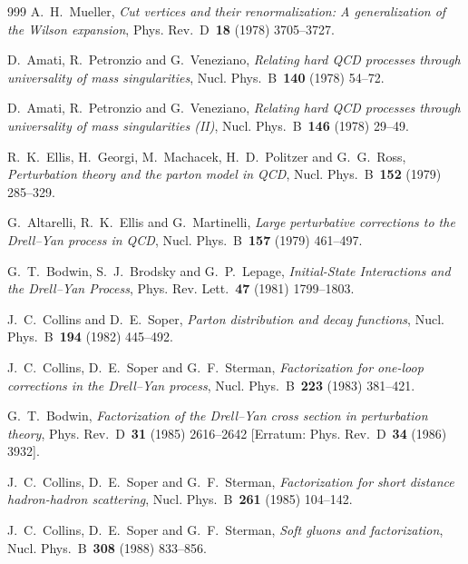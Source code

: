 \begin{thebibliography}{999}
A.~H.~Mueller, \emph{Cut vertices and their renormalization: A generalization of the Wilson expansion}, Phys. Rev.~D~\textbf{18} (1978) \mbox{3705--3727}.

D.~Amati, R.~Petronzio and G.~Veneziano, \emph{Relating hard QCD processes through universality of mass singularities}, Nucl. Phys.~B~\textbf{140} (1978) \mbox{54--72}.

D.~Amati, R.~Petronzio and G.~Veneziano, \emph{Relating hard QCD processes through universality of mass singularities (II)}, Nucl. Phys.~B~\textbf{146} (1978) \mbox{29--49}.

R.~K.~Ellis, H.~Georgi, M.~Machacek, H.~D.~Politzer and G.~G.~Ross, \emph{Perturbation theory and the parton model in QCD}, Nucl. Phys.~B~\textbf{152} (1979) \mbox{285--329}.

G.~Altarelli, R.~K.~Ellis and G.~Martinelli, \emph{Large perturbative corrections to the Drell--Yan process in QCD}, Nucl. Phys.~B~\textbf{157} (1979) \mbox{461--497}.

G.~T.~Bodwin, S.~J.~Brodsky and G.~P.~Lepage, \emph{Initial-State Interactions and the Drell--Yan Process}, Phys. Rev. Lett.~\textbf{47} (1981) \mbox{1799--1803}.

J.~C.~Collins and D.~E.~Soper, \emph{Parton distribution and decay functions}, Nucl. Phys.~B~\textbf{194} (1982) \mbox{445--492}.

J.~C.~Collins, D.~E.~Soper and G.~F.~Sterman, \emph{Factorization for one-loop corrections in the Drell--Yan process}, Nucl. Phys.~B~\textbf{223} (1983) \mbox{381--421}.

G.~T.~Bodwin, \emph{Factorization of the Drell--Yan cross section in perturbation theory}, Phys. Rev.~D~\textbf{31} (1985) \mbox{2616--2642} [Erratum: Phys. Rev.~D~\textbf{34} (1986) \mbox{3932}].

J.~C.~Collins, D.~E.~Soper and G.~F.~Sterman, \emph{Factorization for short distance hadron-hadron scattering}, Nucl. Phys.~B~\textbf{261} (1985) \mbox{104--142}.

J.~C.~Collins, D.~E.~Soper and G.~F.~Sterman, \emph{Soft gluons and factorization}, Nucl. Phys.~B~\textbf{308} (1988) \mbox{833--856}.


\end{thebibliography}
